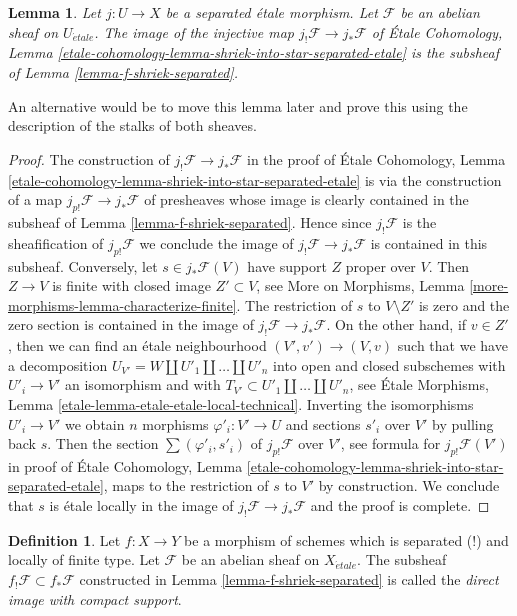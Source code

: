 \documentclass{stacks-project}
\theoremstyle{plain}
\newtheorem{lemma}[subsection]{Lemma}
\theoremstyle{definition}
\newtheorem{definition}[subsection]{Definition}
\theoremstyle{remark}
\numberwithin{equation}{subsection}
\def\etale{{\acute{e}tale}}
\begin{document}
\begin{lemma}
\label{lemma-separated-etale-shriek}
Let $j : U \to X$ be a separated \'etale morphism. Let $\mathcal{F}$
be an abelian sheaf on $U_\etale$. The image of the injective map
$j_!\mathcal{F} \to j_*\mathcal{F}$ of
\'Etale Cohomology, Lemma
\ref{etale-cohomology-lemma-shriek-into-star-separated-etale}
is the subsheaf of Lemma \ref{lemma-f-shriek-separated}.
\end{lemma}

\noindent
An alternative would be to move this lemma later and prove this
using the description of the stalks of both sheaves.

\begin{proof}
The construction of $j_!\mathcal{F} \to j_*\mathcal{F}$ in the proof of
\'Etale Cohomology, Lemma
\ref{etale-cohomology-lemma-shriek-into-star-separated-etale}
is via the construction of a map
$j_{p!}\mathcal{F} \to j_*\mathcal{F}$ of presheaves
whose image is clearly contained in the subsheaf of
Lemma \ref{lemma-f-shriek-separated}.
Hence since $j_!\mathcal{F}$ is the sheafification of
$j_{p!}\mathcal{F}$ we conclude the image of
$j_!\mathcal{F} \to j_*\mathcal{F}$ is contained in
this subsheaf. Conversely, let $s \in j_*\mathcal{F}(V)$
have support $Z$ proper over $V$. Then $Z \to V$ is
finite with closed image $Z' \subset V$, see
More on Morphisms, Lemma \ref{more-morphisms-lemma-characterize-finite}.
The restriction of $s$ to $V \setminus Z'$ is zero and the zero section is
contained in the image of $j_!\mathcal{F} \to j_*\mathcal{F}$.
On the other hand, if $v \in Z'$, then we can find
an \'etale neighbourhood
$(V', v') \to (V, v)$ such that we have a decomposition
$U_{V'} = W \amalg U'_1 \amalg \ldots \amalg U'_n$
into open and closed subschemes with $U'_i \to V'$ an isomorphism
and with $T_{V'} \subset U'_1 \amalg \ldots \amalg U'_n$, see
\'Etale Morphisms, Lemma \ref{etale-lemma-etale-etale-local-technical}.
Inverting the isomorphisms $U'_i \to V'$
we obtain $n$ morphisms $\varphi'_i : V' \to U$
and sections $s'_i$ over $V'$ by pulling back $s$.
Then the section $\sum (\varphi'_i, s'_i)$ of
$j_{p!}\mathcal{F}$ over $V'$, see formula for $j_{p!}\mathcal{F}(V')$
in proof of \'Etale Cohomology, Lemma
\ref{etale-cohomology-lemma-shriek-into-star-separated-etale},
maps to the restriction of $s$ to $V'$ by construction.
We conclude that $s$ is \'etale locally in the image
of $j_!\mathcal{F} \to j_*\mathcal{F}$ and the proof is complete.
\end{proof}

\begin{definition}
\label{definition-f-shriek-separated}
Let $f : X \to Y$ be a morphism of schemes which is separated (!) and
locally of finite type. Let $\mathcal{F}$ be an abelian sheaf on
$X_\etale$. The subsheaf $f_!\mathcal{F} \subset f_*\mathcal{F}$
constructed in Lemma \ref{lemma-f-shriek-separated} is called the
{\it direct image with compact support}.
\end{definition}
\end{document}
